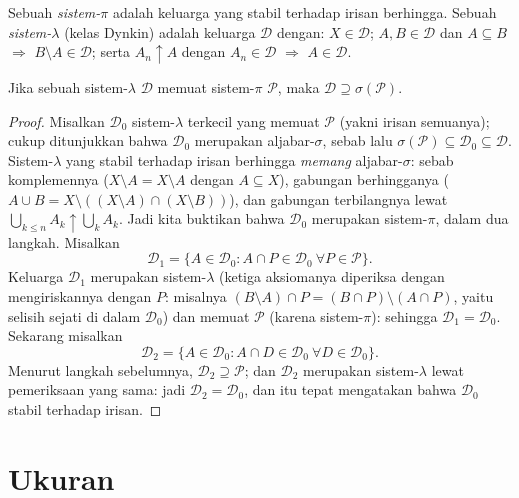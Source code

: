 \begin{definition}\label{def:b3:measure:dynkin}
Sebuah \emph{sistem-$\pi$} adalah keluarga
yang stabil terhadap irisan berhingga. Sebuah
\emph{sistem-$\lambda$}
(kelas Dynkin) adalah keluarga $\mathcal D$ dengan: $X \in \mathcal
D$; $A, B \in \mathcal D$ dan $A \subseteq B$ $\Rightarrow$ $B
\setminus A \in \mathcal D$; serta $A_n \uparrow A$ dengan $A_n \in
\mathcal D$ $\Rightarrow$ $A \in \mathcal D$.
\end{definition}

\begin{theorem}
\label{thm:b3:measure:dynkin}
Jika sebuah sistem-$\lambda$ $\mathcal D$ memuat sistem-$\pi$
$\mathcal P$, maka $\mathcal D \supseteq
\sigma(\mathcal P)$.
\end{theorem}

\begin{proof}
Misalkan $\mathcal D_0$ sistem-$\lambda$ terkecil yang memuat
$\mathcal P$ (yakni irisan semuanya); cukup ditunjukkan bahwa
$\mathcal D_0$ merupakan aljabar-$\sigma$, sebab lalu
$\sigma(\mathcal P) \subseteq \mathcal D_0 \subseteq \mathcal
D$. Sistem-$\lambda$ yang stabil terhadap irisan berhingga
\emph{memang} aljabar-$\sigma$: sebab komplemennya ($X \setminus A = X
\setminus A$ dengan $A \subseteq X$), gabungan berhingganya ($A \cup B =
X \setminus ((X\setminus A)\cap(X\setminus B))$), dan gabungan terbilangnya
lewat $\bigcup_{k \leq n}A_k \uparrow \bigcup_kA_k$. Jadi kita
buktikan bahwa $\mathcal D_0$ merupakan sistem-$\pi$, dalam dua langkah. Misalkan
\[
\mathcal D_1 = \{A \in \mathcal D_0 : A \cap P \in \mathcal
D_0 \ \forall P \in \mathcal P\}.
\]
Keluarga $\mathcal D_1$ merupakan sistem-$\lambda$ (ketiga aksiomanya
diperiksa dengan mengiriskannya dengan $P$: misalnya $(B\setminus A)\cap P
= (B \cap P)\setminus(A \cap P)$, yaitu selisih sejati di dalam
$\mathcal D_0$) dan memuat $\mathcal P$ (karena sistem-$\pi$):
sehingga $\mathcal D_1 = \mathcal D_0$. Sekarang misalkan
\[
\mathcal D_2 = \{A \in \mathcal D_0 : A \cap D \in \mathcal
D_0\ \forall D \in \mathcal D_0\}.
\]
Menurut langkah sebelumnya, $\mathcal D_2 \supseteq \mathcal P$; dan
$\mathcal D_2$ merupakan sistem-$\lambda$ lewat pemeriksaan yang sama:
jadi $\mathcal D_2 = \mathcal D_0$, dan itu tepat mengatakan bahwa
$\mathcal D_0$ stabil terhadap irisan.
\end{proof}

\section{Ukuran}

